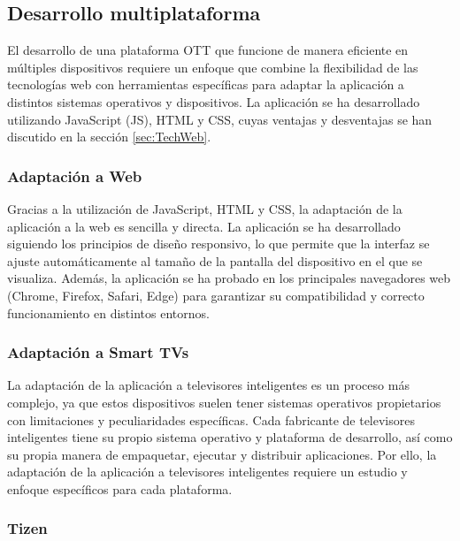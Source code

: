 \subsection{Desarrollo multiplataforma}
\label{subsec:adaptabilidad_multiplataforma}

El desarrollo de una plataforma OTT que funcione de manera eficiente en múltiples dispositivos requiere un 
enfoque que combine la flexibilidad de las tecnologías web con herramientas específicas para adaptar la aplicación 
a distintos sistemas operativos y dispositivos. La aplicación se ha desarrollado utilizando JavaScript (JS), HTML 
y CSS, cuyas ventajas y desventajas se han discutido en la sección \ref{sec:TechWeb}.

\subsubsection{Adaptación a Web}
\label{subsubsec:adaptabilidad_web}

Gracias a la utilización de JavaScript, HTML y CSS, la adaptación de la aplicación a la web es sencilla y 
directa. La aplicación se ha desarrollado siguiendo los principios de diseño responsivo, lo que permite que 
la interfaz se ajuste automáticamente al tamaño de la pantalla del dispositivo en el que se visualiza. Además, 
la aplicación se ha probado en los principales navegadores web (Chrome, Firefox, Safari, Edge) para garantizar 
su compatibilidad y correcto funcionamiento en distintos entornos.

\subsubsection{Adaptación a Smart TVs}
\label{subsubsec:adaptabilidad_smart_tvs}

La adaptación de la aplicación a televisores inteligentes es un proceso más complejo, ya que estos dispositivos 
suelen tener sistemas operativos propietarios con limitaciones y peculiaridades específicas. Cada fabricante de 
televisores inteligentes tiene su propio sistema operativo y plataforma de desarrollo, así como su propia manera 
de empaquetar, ejecutar y distribuir aplicaciones. Por ello, la adaptación de la aplicación a televisores 
inteligentes requiere un estudio y enfoque específicos para cada plataforma.

\subsubsection{Tizen}
\label{subsubsec:adaptabilidad_tizen}

